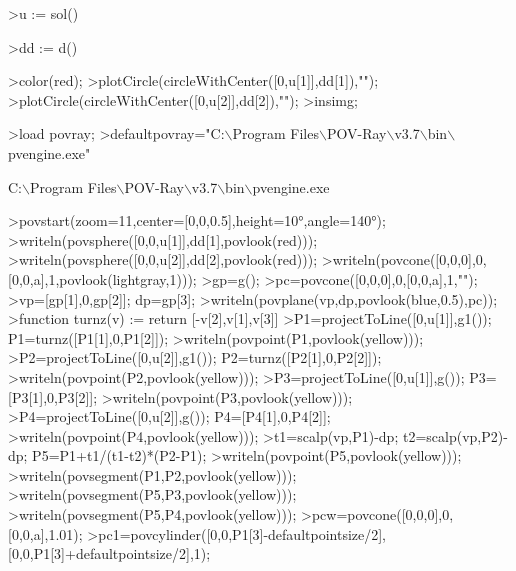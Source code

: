 \documentclass[a4paper,10pt]{article}
\begin{document}
\begin{eulernotebook}
\begin{eulercomment}
\begin{eulercomment}
\begin{euleroutput}
\end{euleroutput}
\begin{eulerprompt}
>u := sol()
\end{eulerprompt}
\begin{euleroutput}
  [0.333333,  1]
\end{euleroutput}
\begin{eulerprompt}
>dd := d()
\end{eulerprompt}
\begin{euleroutput}
  [0.149071,  0.447214]
\end{euleroutput}
\begin{eulerprompt}
>color(red);
>plotCircle(circleWithCenter([0,u[1]],dd[1]),"");
>plotCircle(circleWithCenter([0,u[2]],dd[2]),"");
>insimg;
\end{eulerprompt}
\begin{eulerprompt}
>load povray;
>defaultpovray="C:\(\backslash\)Program Files\(\backslash\)POV-Ray\(\backslash\)v3.7\(\backslash\)bin\(\backslash\)pvengine.exe"
\end{eulerprompt}
\begin{euleroutput}
  C:\(\backslash\)Program Files\(\backslash\)POV-Ray\(\backslash\)v3.7\(\backslash\)bin\(\backslash\)pvengine.exe
\end{euleroutput}
\begin{eulerprompt}
>povstart(zoom=11,center=[0,0,0.5],height=10°,angle=140°);
>writeln(povsphere([0,0,u[1]],dd[1],povlook(red)));
>writeln(povsphere([0,0,u[2]],dd[2],povlook(red)));
>writeln(povcone([0,0,0],0,[0,0,a],1,povlook(lightgray,1)));
>gp=g();
>pc=povcone([0,0,0],0,[0,0,a],1,"");
>vp=[gp[1],0,gp[2]]; dp=gp[3];
>writeln(povplane(vp,dp,povlook(blue,0.5),pc));
>function turnz(v) := return [-v[2],v[1],v[3]]
>P1=projectToLine([0,u[1]],g1()); P1=turnz([P1[1],0,P1[2]]);
>writeln(povpoint(P1,povlook(yellow)));
>P2=projectToLine([0,u[2]],g1()); P2=turnz([P2[1],0,P2[2]]);
>writeln(povpoint(P2,povlook(yellow)));
>P3=projectToLine([0,u[1]],g()); P3=[P3[1],0,P3[2]];
>writeln(povpoint(P3,povlook(yellow)));
>P4=projectToLine([0,u[2]],g()); P4=[P4[1],0,P4[2]];
>writeln(povpoint(P4,povlook(yellow)));
>t1=scalp(vp,P1)-dp; t2=scalp(vp,P2)-dp; P5=P1+t1/(t1-t2)*(P2-P1);
>writeln(povpoint(P5,povlook(yellow)));
>writeln(povsegment(P1,P2,povlook(yellow)));
>writeln(povsegment(P5,P3,povlook(yellow)));
>writeln(povsegment(P5,P4,povlook(yellow)));
>pcw=povcone([0,0,0],0,[0,0,a],1.01);
>pc1=povcylinder([0,0,P1[3]-defaultpointsize/2],[0,0,P1[3]+defaultpointsize/2],1);

\end{eulerprompt}
\end{eulercomment}
\end{eulercomment}
\end{eulernotebook}
\end{document}
